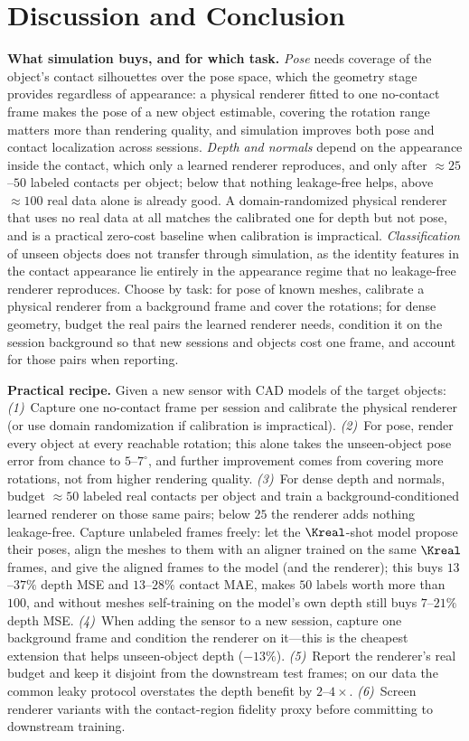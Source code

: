 \section{Discussion and Conclusion}

\noindent\textbf{What simulation buys, and for which task.}
\emph{Pose} needs coverage of the object's contact silhouettes over the pose space, which the geometry stage provides regardless of appearance: a physical renderer fitted to one no-contact frame makes the pose of a new object estimable, covering the rotation range matters more than rendering quality, and simulation improves both pose and contact localization across sessions. \emph{Depth and normals} depend on the appearance inside the contact, which only a learned renderer reproduces, and only after $\approx\!25$--$50$ labeled contacts per object; below that nothing leakage-free helps, above $\approx\!100$ real data alone is already good. A domain-randomized physical renderer that uses no real data at all matches the calibrated one for depth but not pose, and is a practical zero-cost baseline when calibration is impractical. \emph{Classification} of unseen objects does not transfer through simulation, as the identity features in the contact appearance lie entirely in the appearance regime that no leakage-free renderer reproduces. Choose by task: for pose of known meshes, calibrate a physical renderer from a background frame and cover the rotations; for dense geometry, budget the real pairs the learned renderer needs, condition it on the session background so that new sessions and objects cost one frame, and account for those pairs when reporting.

\noindent\textbf{Practical recipe.}
Given a new sensor with CAD models of the target objects:
\emph{(1)}~Capture one no-contact frame per session and calibrate the physical renderer (or use domain randomization if calibration is impractical).
\emph{(2)}~For pose, render every object at every reachable rotation; this alone takes the unseen-object pose error from chance to $5$--$7^\circ$, and further improvement comes from covering more rotations, not from higher rendering quality.
\emph{(3)}~For dense depth and normals, budget $\approx\!50$ labeled real contacts per object and train a background-conditioned learned renderer on those same pairs; below $25$ the renderer adds nothing leakage-free. Capture unlabeled frames freely: let the $\Kreal$-shot model propose their poses, align the meshes to them with an aligner trained on the same $\Kreal$ frames, and give the aligned frames to the model (and the renderer); this buys $13$--$37\%$ depth MSE and $13$--$28\%$ contact MAE, makes $50$ labels worth more than $100$, and without meshes self-training on the model's own depth still buys $7$--$21\%$ depth MSE.
\emph{(4)}~When adding the sensor to a new session, capture one background frame and condition the renderer on it---this is the cheapest extension that helps unseen-object depth ($-13\%$).
\emph{(5)}~Report the renderer's real budget and keep it disjoint from the downstream test frames; on our data the common leaky protocol overstates the depth benefit by $2$--$4\times$.
\emph{(6)}~Screen renderer variants with the contact-region fidelity proxy before committing to downstream training.

